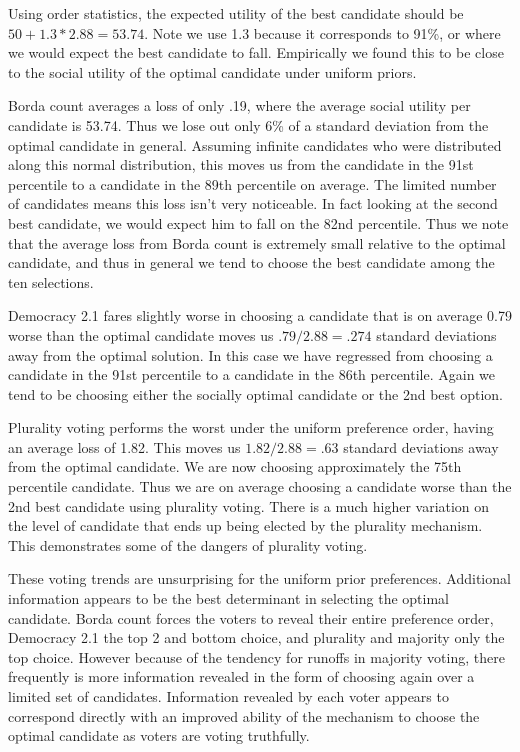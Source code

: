 \documentclass[11pt]{scrartcl}
\begin{document}
Using order statistics, the expected utility of the best candidate should be $50 + 1.3*2.88 = 53.74$. Note we use 1.3 because it corresponds to 91\%, or where we would expect the best candidate to fall. Empirically we found this to be close to the social utility of the optimal candidate under uniform priors.

Borda count averages a loss of only .19, where the average social utility per candidate is 53.74. Thus we lose out only 6\% of a standard deviation from the optimal candidate in general. Assuming infinite candidates who were distributed along this normal distribution, this moves us from the candidate in the 91st percentile to a candidate in the 89th percentile on average. The limited number of candidates means this loss isn't very noticeable. In fact looking at the second best candidate, we would expect him to fall on the 82nd percentile. Thus we note that the average loss from Borda count is extremely small relative to the optimal candidate, and thus in general we tend to choose the best candidate among the ten selections.

Democracy 2.1 fares slightly worse in choosing a candidate that is on average 0.79 worse than the optimal candidate moves us $.79/2.88 = .274$ standard deviations away from the optimal solution. In this case we have regressed from choosing a candidate in the 91st percentile to a candidate in the 86th percentile. Again we tend to be choosing either the socially optimal candidate or the 2nd best option.

Plurality voting performs the worst under the uniform preference order, having an average loss of 1.82. This moves us $1.82/2.88 = .63$ standard deviations away from the optimal candidate. We are now choosing approximately the 75th percentile candidate. Thus we are on average choosing a candidate worse than the 2nd best candidate using plurality voting. There is a much higher variation on the level of candidate that ends up being elected by the plurality mechanism. This demonstrates some of the dangers of plurality voting.

These voting trends are unsurprising for the uniform prior preferences. Additional information appears to be the best determinant in selecting the optimal candidate. Borda count forces the voters to reveal their entire preference order, Democracy 2.1 the top 2 and bottom choice, and plurality and majority only the top choice. However because of the tendency for runoffs in majority voting, there frequently is more information revealed in the form of choosing again over a limited set of candidates. Information revealed by each voter appears to correspond directly with an improved ability of the mechanism to choose the optimal candidate as voters are voting truthfully.\\
\end{document}
